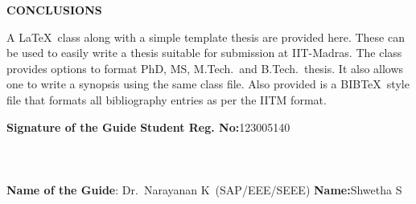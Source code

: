 	
	\begin{center}
		\Large{{\textbf{CONCLUSIONS}}}
	\end{center}
	
		\noindent A \LaTeX\ class along with a simple template thesis are provided here.  These can be used to easily write a thesis suitable for submission at IIT-Madras.  The class provides options to format PhD, MS, M.Tech.\ and B.Tech.\ thesis.  It also allows one to write a synopsis using the same class file.  Also provided is a BIB\TeX\ style file that formats all bibliography entries as per the IITM format.
	
	\vspace*{24pt}
	
		\noindent \textbf{Signature of the Guide} \hspace*{70mm} \textbf{Student Reg. No:}123005140\\
			\\
		\\
		\\
	\noindent \textbf{Name of the Guide}:{ Dr.~Narayanan K}~(SAP/EEE/SEEE) \hspace*{15mm} \textbf{Name:}Shwetha S
	\pagebreak
	\pagebreak
	
	
